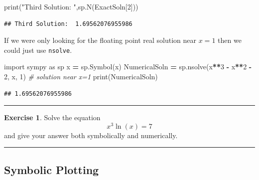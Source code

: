 \documentclass[
]{book}
\newenvironment{Shaded}{\begin{snugshade}}{\end{snugshade}}
\newcommand{\BuiltInTok}[1]{#1}
\newcommand{\CommentTok}[1]{\textcolor[rgb]{0.56,0.35,0.01}{\textit{#1}}}
\newcommand{\DecValTok}[1]{\textcolor[rgb]{0.00,0.00,0.81}{#1}}
\newcommand{\ImportTok}[1]{#1}
\newcommand{\NormalTok}[1]{#1}
\newcommand{\OperatorTok}[1]{\textcolor[rgb]{0.81,0.36,0.00}{\textbf{#1}}}
\newcommand{\StringTok}[1]{\textcolor[rgb]{0.31,0.60,0.02}{#1}}
\theoremstyle{definition}
\theoremstyle{definition}
\theoremstyle{definition}
\newtheorem{exercise}{Exercise}[chapter]
\theoremstyle{remark}
\begin{document}
\begin{Shaded}
\begin{Highlighting}[]
\BuiltInTok{print}\NormalTok{(}\StringTok{"Third Solution: "}\NormalTok{,sp.N(ExactSoln[}\DecValTok{2}\NormalTok{]))}
\end{Highlighting}
\end{Shaded}

\begin{verbatim}
## Third Solution:  1.69562076955986
\end{verbatim}

If we were only looking for the floating point real solution near \(x=1\) then we could just use \texttt{nsolve}.

\begin{Shaded}
\begin{Highlighting}[]
\ImportTok{import}\NormalTok{ sympy }\ImportTok{as}\NormalTok{ sp}
\NormalTok{x }\OperatorTok{=}\NormalTok{ sp.Symbol(}\StringTok{\textquotesingle{}x\textquotesingle{}}\NormalTok{)}
\NormalTok{NumericalSoln }\OperatorTok{=}\NormalTok{ sp.nsolve(x}\OperatorTok{**}\DecValTok{3} \OperatorTok{{-}}\NormalTok{ x}\OperatorTok{**}\DecValTok{2} \OperatorTok{{-}} \DecValTok{2}\NormalTok{, x, }\DecValTok{1}\NormalTok{) }\CommentTok{\# solution near x=1}
\BuiltInTok{print}\NormalTok{(NumericalSoln)}
\end{Highlighting}
\end{Shaded}

\begin{verbatim}
## 1.69562076955986
\end{verbatim}

\begin{center}\rule{0.5\linewidth}{0.5pt}\end{center}

\begin{exercise}
\protect\hypertarget{exr:unnamed-chunk-830}{}{\label{exr:unnamed-chunk-830} }Solve the equation \[x^3 \ln(x) = 7\] and give your answer both symbolically and numerically.
\end{exercise}

\begin{center}\rule{0.5\linewidth}{0.5pt}\end{center}

\hypertarget{symbolic-plotting}{%
\subsection{Symbolic Plotting}\label{symbolic-plotting}}
\end{document}
